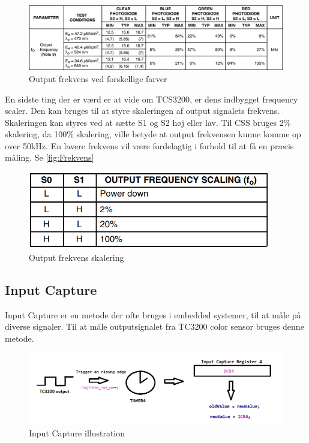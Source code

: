 \begin{figure}[H]
	\centering
	\includegraphics[width = 500pt]{Img/FarveSpektrum.png}
	\caption{Output frekvens ved forskellige farver}
	\label{fig:FarveSpektrum}
\end{figure}

En sidste ting der er værd er at vide om TCS3200, er dens indbygget frequency scaler. Den kan bruges til at styre skaleringen af output signalets frekvens. Skaleringen kan styres ved at sætte S1 og S2 høj eller lav. Til CSS bruges 2\% skalering, da 100\% skalering, ville betyde at output frekvensen kunne komme op over 50kHz. En lavere frekvens vil være fordelagtig i forhold til at få en præcis måling. Se \autoref{fig:Frekvens}

\begin{figure}[H]
	\centering
	\includegraphics[width = 300pt]{Img/Frekvens.png}
	\caption{Output frekvens skalering}
	\label{fig:Frekvens}
\end{figure}

\subsection{Input Capture}
Input Capture er en metode der ofte bruges i embedded systemer, til at måle på diverse signaler. Til at måle outputsignalet fra TC3200 color sensor bruges denne metode.

\begin{figure}[H]
	\centering
	\includegraphics[width = 500pt]{Img/InputCapture.png}
	\caption{Input Capture illustration}
	\label{fig:InputCapture}
\end{figure}


